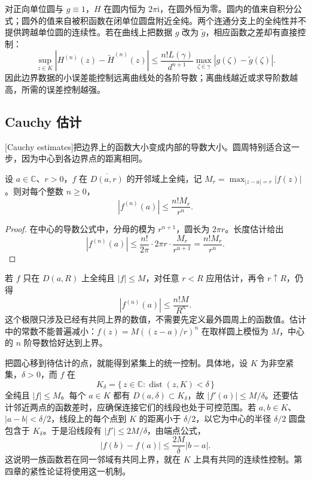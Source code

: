 \ProseParagraphBreak

对正向单位圆与 \(g\equiv1\)，\(H\) 在圆内恒为 \(2\pi\mathrm{i}\)，在圆外恒为零。圆内的值来自积分公式；圆外的值来自被积函数在闭单位圆盘附近全纯。两个连通分支上的全纯性并不提供跨越单位圆的连续性。若在曲线上把数据 \(g\) 改为 \(\widetilde g\)，相应函数之差却有直接控制：
\[
 \sup_{z\in K}|H^{(n)}(z)-\widetilde H^{(n)}(z)|
 \le \frac{n!L(\gamma)}{d^{n+1}}
       \max_{\zeta\in\gamma}|g(\zeta)-\widetilde g(\zeta)|.
\]
因此边界数据的小误差能控制远离曲线处的各阶导数；离曲线越近或求导阶数越高，所需的误差控制越强。

\subsection{Cauchy 估计}
\label{b3:subsec:020303}

[Cauchy estimates]把边界上的函数大小变成内部的导数大小。圆周特别适合这一步，因为中心到各边界点的距离相同。

\begin{theorem}[Cauchy 估计]\label{b3:thm:02-cauchy-estimate}
设 \(a\in\mathbb C\)、\(r>0\)，\(f\) 在 \(\overline{D(a,r)}\) 的开邻域上全纯，记 \(M_r=\max_{|z-a|=r}|f(z)|\)。则对每个整数 \(n\ge0\)，
\[
 |f^{(n)}(a)|\le\frac{n!M_r}{r^n}.
\]
\end{theorem}
\begin{proof}
在中心的导数公式中，分母的模为 \(r^{n+1}\)，圆长为 \(2\pi r\)。长度估计给出
\[
 |f^{(n)}(a)|
 \le\frac{n!}{2\pi}\cdot2\pi r\cdot\frac{M_r}{r^{n+1}}
 =\frac{n!M_r}{r^n}.
\]
\end{proof}

若 \(f\) 只在 \(D(a,R)\) 上全纯且 \(|f|\le M\)，对任意 \(r<R\) 应用估计，再令 \(r\uparrow R\)，仍得
\[
 |f^{(n)}(a)|\le\frac{n!M}{R^n}.
\]
这个极限只涉及已经有共同上界的数值，不需要先定义最外圆周上的函数值。估计中的常数不能普遍减小：\(f(z)=M((z-a)/r)^n\) 在取样圆上模恒为 \(M\)，中心的 \(n\) 阶导数恰好达到上界。

\ProseParagraphBreak

把圆心移到待估计的点，就能得到紧集上的统一控制。具体地，设 \(K\) 为非空紧集，\(\delta>0\)，而 \(f\) 在
\[
 K_\delta=\{\,z\in\mathbb C:\operatorname{dist}(z,K)<\delta\,\}
\]
全纯且 \(|f|\le M\)。每个 \(a\in K\) 都有 \(D(a,\delta)\subset K_\delta\)，故 \(|f'(a)|\le M/\delta\)。还要估计邻近两点的函数差时，应确保连接它们的线段也处于可控范围。若 \(a,b\in K\)、\(|a-b|<\delta/2\)，线段上的每个点到 \(K\) 的距离小于 \(\delta/2\)，以它为中心的半径 \(\delta/2\) 圆盘包含于 \(K_\delta\)。于是沿线段有 \(|f'|\le2M/\delta\)，由端点公式，
\[
 |f(b)-f(a)|\le\frac{2M}{\delta}|b-a|.
\]
这说明一族函数若在同一邻域有共同上界，就在 \(K\) 上具有共同的连续性控制。第四章的紧性论证将使用这一机制。


